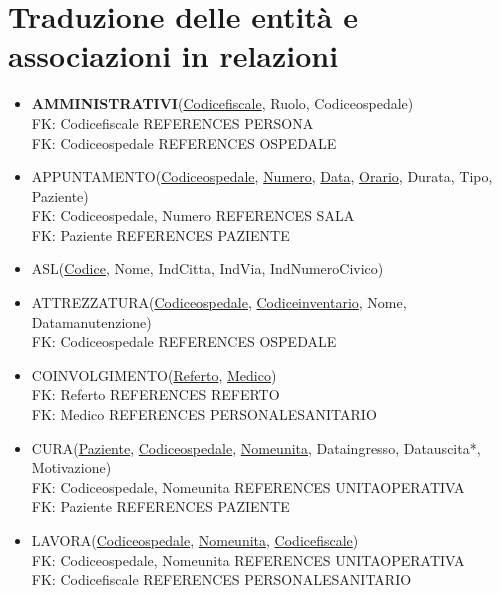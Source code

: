 \documentclass[a4paper,12pt]{report}
\begin{document}
\section{Traduzione delle entità e associazioni in relazioni}
\begin{itemize}
  \item \textbf{AMMINISTRATIVI}(\underline{Codice\textunderscore fiscale}, Ruolo, Codice\textunderscore ospedale) 
  \\ FK: Codice\textunderscore fiscale REFERENCES PERSONA
  \\ FK: Codice\textunderscore ospedale REFERENCES OSPEDALE
  \item APPUNTAMENTO(\underline{Codice\textunderscore ospedale}, \underline{Numero}, \underline{Data}, \underline{Orario}, Durata, Tipo, Paziente)
  \\ FK: Codice\textunderscore ospedale, Numero REFERENCES SALA
  \\ FK: Paziente REFERENCES PAZIENTE
  \item ASL(\underline{Codice}, Nome, Ind\textunderscore Citta, Ind\textunderscore Via, Ind\textunderscore Numero\textunderscore Civico)
  \item ATTREZZATURA(\underline{Codice\textunderscore ospedale}, \underline{Codice\textunderscore inventario}, Nome, Data\textunderscore manutenzione)
  \\ FK: Codice\textunderscore ospedale REFERENCES OSPEDALE
  \item COINVOLGIMENTO(\underline{Referto}, \underline{Medico})
  \\ FK: Referto REFERENCES REFERTO
  \\ FK: Medico REFERENCES PERSONALE\textunderscore SANITARIO
  \item CURA(\underline{Paziente}, \underline{Codice\textunderscore ospedale}, \underline{Nome\textunderscore unita}, Data\textunderscore ingresso, Data\textunderscore uscita*, Motivazione)
  \\ FK: Codice\textunderscore ospedale, Nome\textunderscore unita REFERENCES UNITA\textunderscore OPERATIVA
  \\ FK: Paziente REFERENCES PAZIENTE
  \item LAVORA(\underline{Codice\textunderscore ospedale}, \underline{Nome\textunderscore unita}, \underline{Codice\textunderscore fiscale})
  \\ FK: Codice\textunderscore ospedale, Nome\textunderscore unita REFERENCES UNITA\textunderscore OPERATIVA
  \\ FK: Codice\textunderscore fiscale REFERENCES PERSONALE\textunderscore SANITARIO

\end{itemize}
\end{document}
